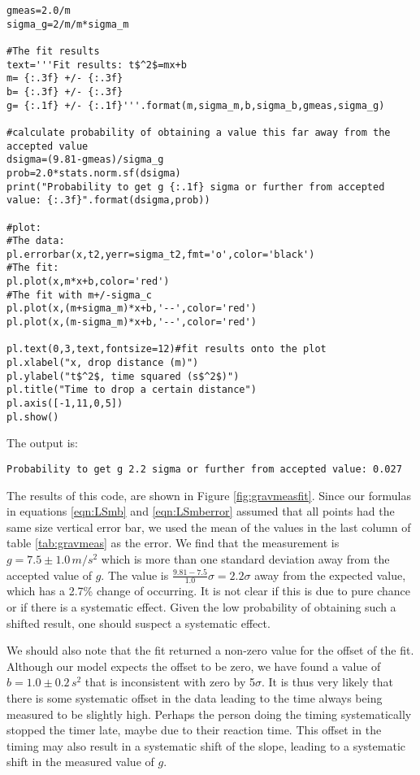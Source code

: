 \begin{example}{}
\begin{lstlisting}[frame=single]
gmeas=2.0/m
sigma_g=2/m/m*sigma_m

#The fit results
text='''Fit results: t$^2$=mx+b
m= {:.3f} +/- {:.3f}
b= {:.3f} +/- {:.3f}
g= {:.1f} +/- {:.1f}'''.format(m,sigma_m,b,sigma_b,gmeas,sigma_g)

#calculate probability of obtaining a value this far away from the accepted value
dsigma=(9.81-gmeas)/sigma_g
prob=2.0*stats.norm.sf(dsigma)
print("Probability to get g {:.1f} sigma or further from accepted value: {:.3f}".format(dsigma,prob))

#plot:
#The data:
pl.errorbar(x,t2,yerr=sigma_t2,fmt='o',color='black')
#The fit:
pl.plot(x,m*x+b,color='red')
#The fit with m+/-sigma_c
pl.plot(x,(m+sigma_m)*x+b,'--',color='red')
pl.plot(x,(m-sigma_m)*x+b,'--',color='red')

pl.text(0,3,text,fontsize=12)#fit results onto the plot
pl.xlabel("x, drop distance (m)")
pl.ylabel("t$^2$, time squared (s$^2$)")
pl.title("Time to drop a certain distance")
pl.axis([-1,11,0,5])
pl.show()

\end{lstlisting}
The output is:
\begin{verbatim}
Probability to get g 2.2 sigma or further from accepted value: 0.027
\end{verbatim}
The results of this code, are shown in Figure \ref{fig:gravmeasfit}. Since our formulas in equations \ref{eqn:LSmb} and \ref{eqn:LSmberror} assumed that all points had the same size vertical error bar, we used the mean of the values in the last column of table \ref{tab:gravmeas} as the error. We find that the measurement is $g=7.5\pm1.0\, m/s^2$ which is more than one standard deviation away from the accepted value of $g$. The value is $\frac{9.81-7.5}{1.0}\sigma=2.2\sigma$ away from the expected value, which has a 2.7\% change of occurring. It is not clear if this is due to pure chance or if there is a systematic effect. Given the low probability of obtaining such a shifted result, one should suspect a systematic effect. 


We should also note that the fit returned a non-zero value for the offset of the fit. Although our model expects the offset to be zero, we have found a value of $b=1.0\pm0.2\,s^2$ that is inconsistent with zero by 5$\sigma$. It is thus very likely that there is some systematic offset in the data leading to the time always being measured to be slightly high. Perhaps the person doing the timing systematically stopped the timer late, maybe due to their reaction time. This offset in the timing may also result in a systematic shift of the slope, leading to a systematic shift in the measured value of $g$. 


\end{example}
